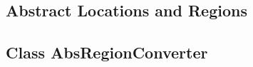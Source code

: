 \subsection{Abstract Locations and Regions}
\label{sec:abslocs}


\subsection{Class AbsRegionConverter}
